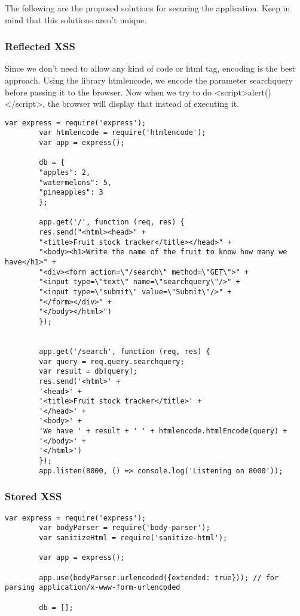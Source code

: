 \begin{Answer}[ref={websec-xss-prevention}]
	The following are the proposed solutions for securing the application. Keep in mind that this solutions aren't unique.
	
	\subsubsection{Reflected XSS}
	Since we don't need to allow any kind of code or html tag, encoding is the best approach. Using the library htmlencode, we encode the parameter searchquery before passing it to the browser. Now when we try to do <script>alert()</script>, the browser will display that instead of executing it.
		\begin{lstlisting}[style=JavaScript]
		var express = require('express');
		var htmlencode = require('htmlencode');
		var app = express();
		
		db = {
		"apples": 2,
		"watermelons": 5,
		"pineapples": 3
		};
		
		app.get('/', function (req, res) {
		res.send("<html><head>" +
		"<title>Fruit stock tracker</title></head>" +
		"<body><h1>Write the name of the fruit to know how many we have</h1>" +
		"<div><form action=\"/search\" method=\"GET\">" +
		"<input type=\"text\" name=\"searchquery\"/>" +
		"<input type=\"submit\" value=\"Submit\"/>" +
		"</form></div>" +
		"</body></html>")
		});
		
		
		app.get('/search', function (req, res) {
		var query = req.query.searchquery;
		var result = db[query];
		res.send('<html>' +
		'<head>' +
		'<title>Fruit stock tracker</title>' +
		'</head>' +
		'<body>' +
		'We have ' + result + ' ' + htmlencode.htmlEncode(query) +
		'</body>' +
		'</html>')
		});
		app.listen(8000, () => console.log('Listening on 8000'));
		\end{lstlisting}
	\subsubsection{Stored XSS}
		\begin{lstlisting}[style=JavaScript]
		var express = require('express');
		var bodyParser = require('body-parser');
		var sanitizeHtml = require('sanitize-html');
		
		var app = express();
		
		app.use(bodyParser.urlencoded({extended: true})); // for parsing application/x-www-form-urlencoded
		
		db = [];
		

\end{lstlisting}
\end{Answer}

